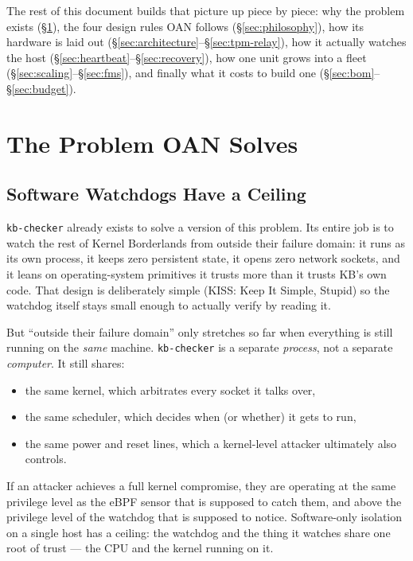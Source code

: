 \documentclass[11pt,a4paper]{article}
\begin{document}
The rest of this document builds that picture up piece by piece: why
the problem exists (\S\ref{sec:problem}), the four design rules OAN
follows (\S\ref{sec:philosophy}), how its hardware is laid out
(\S\ref{sec:architecture}--\S\ref{sec:tpm-relay}), how it actually
watches the host (\S\ref{sec:heartbeat}--\S\ref{sec:recovery}), how one
unit grows into a fleet (\S\ref{sec:scaling}--\S\ref{sec:fms}), and
finally what it costs to build one (\S\ref{sec:bom}--\S\ref{sec:budget}).

\section{The Problem OAN Solves}
\label{sec:problem}

\subsection{Software Watchdogs Have a Ceiling}

\texttt{kb-checker} already exists to solve a version of this problem.
Its entire job is to watch the rest of Kernel Borderlands from outside
their failure domain: it runs as its own process, it keeps zero
persistent state, it opens zero network sockets, and it leans on
operating-system primitives it trusts more than it trusts KB's own
code. That design is deliberately simple (KISS: Keep It Simple,
Stupid) so the watchdog itself stays small enough to actually verify by
reading it.

But ``outside their failure domain'' only stretches so far when
everything is still running on the \emph{same} machine. \texttt{kb-checker}
is a separate \emph{process}, not a separate \emph{computer}. It still
shares:

\begin{itemize}
  \item the same kernel, which arbitrates every socket it talks over,
  \item the same scheduler, which decides when (or whether) it gets to
    run,
  \item the same power and reset lines, which a kernel-level attacker
    ultimately also controls.
\end{itemize}

If an attacker achieves a full kernel compromise, they are operating at
the same privilege level as the eBPF sensor that is supposed to catch
them, and above the privilege level of the watchdog that is supposed to
notice. Software-only isolation on a single host has a ceiling: the
watchdog and the thing it watches share one root of trust --- the CPU
and the kernel running on it.
\end{document}
